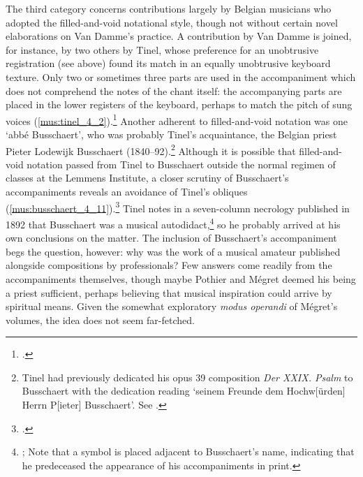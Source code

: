 The third category concerns contributions largely by Belgian musicians who adopted the filled-and-void notational style, though not without certain novel elaborations on Van Damme's practice.
A contribution by Van Damme is joined, for instance, by two others by Tinel, whose preference for an unobtrusive registration (see  above) found its match in an equally unobtrusive keyboard texture.
Only two or sometimes three parts are used in the accompaniment which does not comprehend the notes of the chant itself: the \mbox{accompanying} parts are placed in the lower registers of the keyboard, perhaps to match the pitch of sung voices (\cref{mus:tinel_4_2}).\footnote{\cite[4:1--2]{Melodieschantgregorien1892}.}
Another adherent to filled-and-void notation was one `abbé Busschaert', who was probably Tinel's acquaintance, the Belgian priest Pieter Lodewijk Busschaert (1840--92).\footnote{Tinel had previously dedicated his opus 39 composition \emph{Der XXIX. Psalm} to Busschaert with the dedication reading `seinem Freunde dem Hochw[ürden] Herrn P[ieter] Busschaert'. See \cite[1]{TinelXXIXPsalmVierstimmiger1890}.}
Although it is possible that filled-and-void notation passed from Tinel to Busschaert outside the normal regimen of classes at the Lemmens Institute, a closer scrutiny of Busschaert's accompaniments reveals an avoidance of Tinel's obliques (\cref{mus:busschaert_4_11}).\footnote{\cite[4:11]{Melodieschantgregorien1892}.}
Tinel notes in a seven-column necrology published in 1892 that Busschaert was a musical autodidact,\footnote{\cite[The necrology is printed in the Brussels-based \emph{Musica sacra}, spelled as \emph{Musis Sacrae} in][300]{AntcliffeMusicFlemishMovement1946}; Note that a \dagger{} symbol is placed adjacent to Busschaert's name, indicating that he predeceased the appearance of his accompaniments in print.} so he probably arrived at his own conclusions on the matter.
The inclusion of Busschaert's accompaniment begs the question, however: why was the work of a musical amateur published alongside compositions by professionals?
Few answers come readily from the accompaniments themselves, though maybe Pothier and Mégret deemed his being a priest sufficient, perhaps believing that musical inspiration could arrive by spiritual means.
Given the somewhat exploratory \emph{modus operandi} of Mégret's volumes, the idea does not seem far-fetched.

